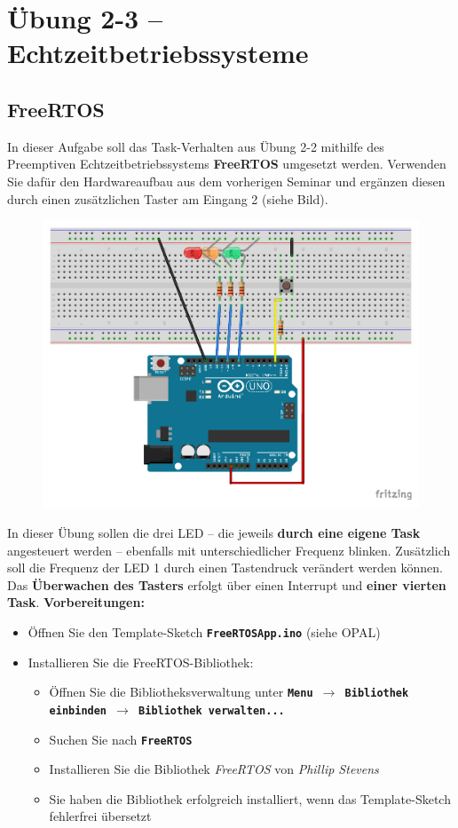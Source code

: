 \documentclass[
    fontsize=12pt,                      %
    paper=a4,                           %
    twoside=off,                       %
    DIV=15,                             %
    BCOR=12mm,                          %
    headings=normal,                    %
    headsepline=false,                   %
    footsepline=false,                  %
    headinclude=true,                   %
    footinclude=false,                  %
    toc=listof,                         %
    toc=bib,                            %
    chapterprefix=false,                %
    appendixprefix=false,               %
    numbers=noendperiod,                %
    captions=tableabove,                %
    footnotes=multiple,                 %
    bibliography=oldstyle,              %
    draft=false,                        %
]{scrreprt}
\newcommand{\Farbcode}[1]{\texttt{\textbf{\textcolor{myred}{#1}}}}
\begin{document}
\chapter*{Übung 2-3 -- Echtzeitbetriebssysteme}

\section*{FreeRTOS}

In dieser Aufgabe soll das Task-Verhalten aus Übung 2-2 mithilfe des Preemptiven Echtzeitbetriebssystems \textbf{FreeRTOS} umgesetzt werden. Verwenden Sie dafür den Hardwareaufbau aus dem vorherigen Seminar und ergänzen diesen durch einen zusätzlichen Taster am Eingang 2 (siehe Bild).
\begin{figure}[H]
	\centering
	\includegraphics[width=\textwidth]{Figures/Scheduler2_Steckplatine}
\end{figure}
\noindent
In dieser Übung sollen die drei LED -- die jeweils \textbf{durch eine eigene Task} angesteuert werden -- ebenfalls mit unterschiedlicher Frequenz blinken. Zusätzlich soll die Frequenz der LED 1 durch einen Tastendruck verändert werden können. Das \textbf{Überwachen des Tasters} erfolgt über einen Interrupt und \textbf{einer vierten Task}.
\newpage
\noindent
\textbf{Vorbereitungen:}

\begin{itemize}
\item Öffnen Sie den Template-Sketch \Farbcode{FreeRTOSApp.ino} (siehe OPAL)
\item Installieren Sie die FreeRTOS-Bibliothek:
\begin{itemize}
\item Öffnen Sie die Bibliotheksverwaltung unter \texttt{\textbf{Menu $\to$ Bibliothek einbinden $\to$ Bibliothek verwalten...}}
\item Suchen Sie nach \texttt{\textbf{FreeRTOS}}
\item Installieren Sie die Bibliothek \emph{FreeRTOS} von \emph{Phillip Stevens}
\item Sie haben die Bibliothek erfolgreich installiert, wenn das Template-Sketch fehlerfrei übersetzt
\end{itemize}
\end{itemize}
\end{document}
